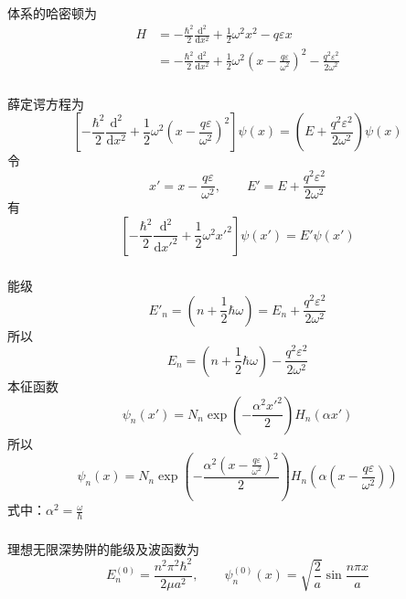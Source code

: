 \begin{frame}
  \frametitle{}
  ~~\\ 
  \解 体系的哈密顿为
  \[ 
    \begin{aligned}
      H &= - \frac{\hbar^2}{2 } \frac{\mathrm{d}^2}{\mathrm{d}x^2} + \frac{1}{2}\omega ^2 x^2 -q \varepsilon x \\
      &=  - \frac{\hbar^2}{2 } \frac{\mathrm{d}^2}{\mathrm{d}x^2} + \frac{1}{2}\omega ^2 \left(x-\frac{q\varepsilon}{ \omega ^2} \right)^2 - \frac{q^2\varepsilon ^2}{2 \omega ^2}
    \end{aligned} \]
\end{frame} 

\begin{frame}
  \frametitle{}
  薛定谔方程为
  \[ \left[ - \frac{\hbar^2}{2 } \frac{\mathrm{d}^2}{\mathrm{d}x^2} + \frac{1}{2}\omega ^2 \left(x-\frac{q\varepsilon}{ \omega ^2} \right)^2 \right] \psi(x) =\left(E+\frac{q^2\varepsilon ^2}{2 \omega ^2} \right) \psi(x) \]
  令 
  \[ x' = x-\frac{q\varepsilon}{ \omega ^2}, \qquad E'= E+\frac{q^2\varepsilon ^2}{2 \omega ^2}\]
  有
  \[ \left[ - \frac{\hbar^2}{2 } \frac{\mathrm{d}^2}{\mathrm{d}x'^2} + \frac{1}{2}\omega ^2 x'^2 \right] \psi(x') =E' \psi(x') \]
\end{frame} 

\begin{frame}
  \frametitle{}
能级
\[E'_n = \left(n+\frac{1}{2}\hbar \omega \right) = E_n+\frac{q^2\varepsilon ^2}{2 \omega ^2}\]
所以 
\[E_n = \left(n+\frac{1}{2}\hbar \omega \right)-\frac{q^2\varepsilon ^2}{2 \omega ^2}\]
本征函数
\[\psi _n(x') = N_n \exp(-\frac{\alpha ^2 x'^2}{2}) H_n(\alpha x') \]
所以
\[\psi _n(x) = N_n \exp(-\frac{\alpha ^2 \left(x-\frac{q\varepsilon}{ \omega ^2}\right) ^2}{2}) H_n(\alpha \left(x-\frac{q\varepsilon}{ \omega ^2}\right)) \]
式中：$\alpha ^2 = \frac{ \omega }{\hbar}$
\end{frame} 

\begin{frame}
  \frametitle{}
 \解 理想无限深势阱的能级及波函数为
 \[ E^{(0)} _n = \frac{n^2\pi ^2 \hbar^2}{2\mu a^2}, \qquad \psi ^{(0)} _n (x) = \sqrt{\frac{2}{a}}\sin \frac{n\pi x}{a}  \]
\end{frame} 

